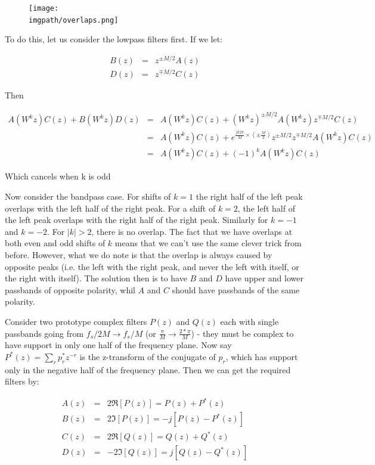\begin{figure}
  \centering
  \texttt{[image: \\imgpath/overlaps.png]}
\end{figure}

To do this, let us consider the lowpass filters first. If we let:

\begin{eqnarray}
  B(z) &=& z^{\pm M/2}A(z) \\
  D(z) &=& z^{\mp M/2}C(z)
\end{eqnarray}

Then

\begin{eqnarray}
  A(W^kz)C(z) + B(W^kz)D(z) &=& A(W^kz)C(z) + (W^kz)^{\pm M/2}A(W^kz) z^{\mp M/2}C(z) \\
  &=& A(W^kz)C(z) + e^{\frac{jk2\pi}{M} \times (\pm \frac{M}{2})} z^{\pm M/2} z^{\mp M/2} A(W^kz)C(z) \\
  &=& A(W^kz)C(z) + (-1)^k A(W^kz)C(z)
\end{eqnarray}

Which cancels when k is odd

Now consider the bandpass case. For shifts of $k=1$ the right half of the left
peak overlaps with the left half of the right peak. For a shift of $k=2$, the
left half of the left peak overlaps with the right half of the right peak.
Similarly for $k=-1$ and $k=-2$. For $|k| > 2$, there is no overlap. The fact
that we have overlaps at both even and odd shifts of $k$ means that we can't use
the same clever trick from before. However, what we do note is that the overlap
is always caused by opposite peaks (i.e. the left with the right peak, and never
the left with itself, or the right with itself). The solution then is to have
$B$ and $D$ have upper and lower passbands of opposite polarity, whil $A$ and
$C$ should have passbands of the same polarity.

Consider two prototype complex filters $P(z)$ and $Q(z)$ each with single
passbands going from $f_s/2M \rightarrow f_s/M$ (or $\frac{\pi}{M} \rightarrow
\frac{2*\pi}{M}$) - they must be complex to have support in only one half of the
frequency plane. Now say $P^*(z) = \sum_{r}p_r^*z^{-r}$ is the z-transform of
the conjugate of $p_r$, which has support only in the negative half of the
frequency plane. Then we can get the required filters by:

\begin{eqnarray}
A(z) &=& 2\Re [P(z)] = P(z) + P^*(z) \\
B(z) &=& 2\Im [P(z)] = -j[P(z) - P^*(z)] \\
C(z) &=& 2\Re [Q(z)] = Q(z) + Q^*(z) \\
D(z) &=& -2\Im [Q(z)] = j[Q(z) - Q^*(z)]
\end{eqnarray}

